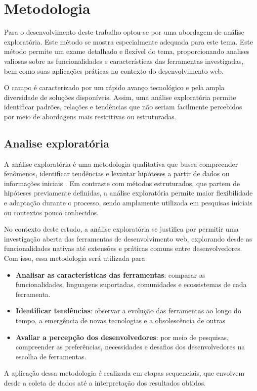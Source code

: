 \chapter{Metodologia}
\label{chap:metodologia}

Para o desenvolvimento deste trabalho optou-se por uma abordagem de análise exploratória. Este método se mostra especialmente adequada para este tema. Este método permite um exame detalhado e flexível do tema, proporcionando analises valiosas sobre as funcionalidades e características das ferramentas investigadas, bem como suas aplicações práticas no contexto do desenvolvimento web.

O campo é caracterizado por um rápido avanço tecnológico e pela ampla diversidade de soluções disponíveis. Assim, uma análise exploratória permite identificar padrões, relações e tendências que não seriam facilmente percebidos por meio de abordagens mais restritivas ou estruturadas.

\section{Analise exploratória}
A análise exploratória é uma metodologia qualitativa que busca compreender fenômenos, identificar tendências e levantar hipóteses a partir de dados ou informações iniciais \cite{analise-exploratoria}. Em contraste com métodos estruturados, que partem de hipóteses previamente definidas, a análise exploratória permite maior flexibilidade e adaptação durante o processo, sendo amplamente utilizada em pesquisas iniciais ou contextos pouco conhecidos.

No contexto deste estudo, a análise exploratória se justifica por permitir uma investigação aberta das ferramentas de desenvolvimento web, explorando desde as funcionalidades nativas até extensões e práticas comuns entre desenvolvedores. Com isso, essa metodologia será utilizada para:

\begin{itemize}
    \item \textbf{Analisar as características das ferramentas}: comparar as funcionalidades, linguagens suportadas, comunidades e ecossistemas de cada ferramenta.
    \item \textbf{Identificar tendências}: observar a evolução das ferramentas ao longo do tempo, a emergência de novas tecnologias e a obsolescência de outras
    \item \textbf{Avaliar a percepção dos desenvolvedores}: por meio de pesquisas, compreender as preferências, necessidades e desafios dos desenvolvedores na escolha de ferramentas.
\end{itemize}

A aplicação dessa metodologia é realizada em etapas sequenciais, que envolvem desde a coleta de dados até a interpretação dos resultados obtidos.
